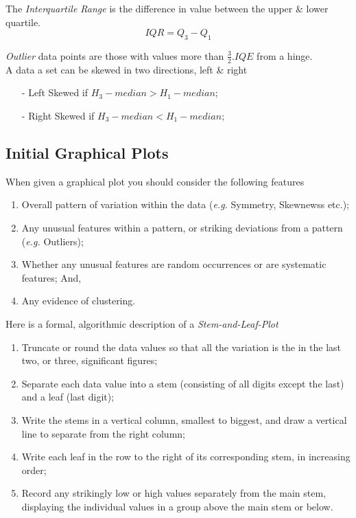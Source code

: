 \documentclass[11pt,a4paper]{article}
\begin{document}
The \textit{Interquartile Range} is the difference in value between the upper \& lower quartile.
$$IQR=Q_3-Q_1$$

\textit{Outlier} data points are those with values more than $\frac{3}{2}.IQE$ from a hinge.\\

A data a set can be skewed in two directions, left \& right
\begin{itemize}
	\item[-] Left Skewed if $H_3-median>H_1-median$;
	\item[-] Right Skewed if $H_3-median<H_1-median$;
\end{itemize}

\subsection{Initial Graphical Plots}

When given a graphical plot you should consider the following features
\begin{enumerate}[label=\roman*)]
	\item Overall pattern of variation within the data (\textit{e.g.} Symmetry, Skewnewss etc.);
	\item Any unusual features within a pattern, or striking deviations from a pattern (\textit{e.g.} Outliers);
	\item Whether any unusual features are random occurrences or are systematic features; And,
	\item Any evidence of clustering.
\end{enumerate}

Here is a formal, algorithmic description of a \textit{Stem-and-Leaf-Plot}
\begin{enumerate}[label=\roman*)]
	\item Truncate or round the data values so that all the variation is the in the last two, or three, significant figures;
	\item Separate each data value into a stem (consisting of all digits except the last) and a leaf (last digit);
	\item Write the stems in a vertical column, smallest to biggest, and draw a vertical line to separate from the right column;
	\item Write each leaf in the row to the right of its corresponding stem, in increasing order;
	\item Record any strikingly low or high values separately from the main stem, displaying the individual values in a group above the main stem or below.
\end{enumerate}
\end{document}
